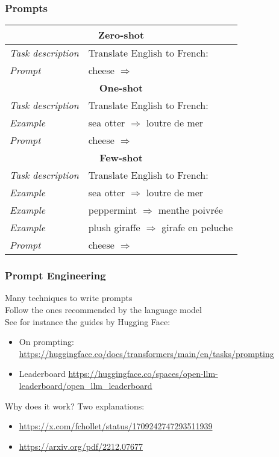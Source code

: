 \begin{frame}[fragile]
\frametitle{Prompts}\color{structure}
\begin{center}
\begin{tabular}{ll}
\multicolumn{2}{c}{\textbf{Zero-shot}}\\
\hline
\hline
\cellcolor{yellow!20}\textit{Task description} & \cellcolor{yellow!20}Translate English to French:  \\
\cellcolor{red!10}\textit{Prompt} & \cellcolor{red!10}cheese $\Rightarrow$  \\
\hline
\multicolumn{2}{c}{\textbf{One-shot}}\\
\hline
\hline
\cellcolor{yellow!20}\textit{Task description}  & \cellcolor{yellow!20}Translate English to French:  \\
\cellcolor{blue!10}\textit{Example} & \cellcolor{blue!10}sea otter $\Rightarrow$ loutre de mer \\
\cellcolor{red!10}\textit{Prompt} & \cellcolor{red!10}cheese $\Rightarrow$ \\
\hline
\multicolumn{2}{c}{\textbf{Few-shot}}\\
\hline
\hline
\cellcolor{yellow!20}\textit{Task description}  & \cellcolor{yellow!20}Translate English to French:  \\
\cellcolor{blue!10}\textit{Example} & \cellcolor{blue!10}sea otter $\Rightarrow$ loutre de mer \\
\cellcolor{blue!10}\textit{Example} & \cellcolor{blue!10}peppermint $\Rightarrow$ menthe poivrée \\
\cellcolor{blue!10}\textit{Example} & \cellcolor{blue!10}plush giraffe $\Rightarrow$ girafe en peluche \\
\cellcolor{red!10}\textit{Prompt} & \cellcolor{red!10}cheese $\Rightarrow$ \\
\hline
\end{tabular} 
\end{center}
\end{frame}

\begin{frame}[fragile]
\frametitle{Prompt Engineering}\color{structure}
Many techniques to write prompts\\
Follow the ones recommended by the language model\\
See for instance the guides by Hugging Face: 
\begin{itemize}\color{structure}
\item On prompting: \url{https://huggingface.co/docs/transformers/main/en/tasks/prompting}
\item Leaderboard \url{https://huggingface.co/spaces/open-llm-leaderboard/open_llm_leaderboard}
\end{itemize}

Why does it work? Two explanations:
\begin{itemize}\color{structure}
\item \url{https://x.com/fchollet/status/1709242747293511939}
\item \url{https://arxiv.org/pdf/2212.07677}
\end{itemize}
\end{frame}

